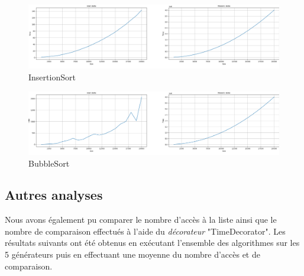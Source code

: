 \documentclass[a4paper,12pt]{article}
\begin{document}
\begin{figure}[H]
    \centering
    \includegraphics[width=\textwidth]{InsertionSort.png}
    \caption{InsertionSort}
    \label{fig:mon_image}
\end{figure}

\begin{figure}[H]
    \centering
    \includegraphics[width=\textwidth]{BubbleSort.png}
    \caption{BubbleSort}
    \label{fig:mon_image}
\end{figure}
\newpage
\subsection{Autres analyses}
    Nous avons également pu comparer le nombre d'accès à la liste ainsi que le nombre de comparaison effectués à l'aide du \textit{décorateur} "TimeDecorator". Les résultats suivants ont été obtenus en exécutant l'ensemble des algorithmes sur les 5 générateurs puis en effectuant une moyenne du nombre d'accès et de comparaison. 
    
\end{document}
